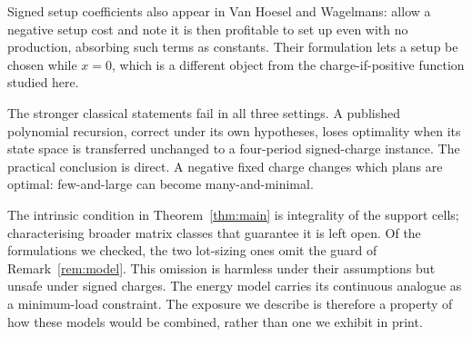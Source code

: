 \documentclass[review,11pt]{elsarticle}
\theoremstyle{remark}
\theoremstyle{definition}
\begin{document}
Signed setup coefficients also appear in Van Hoesel and Wagelmans:
\cite{vhw93} allow a negative setup cost and note it is then profitable to set up even
with no production, absorbing such terms as constants. Their formulation lets a
setup be chosen while $x=0$, which is a different object from the charge-if-positive
function studied here.

The stronger classical statements fail in all three settings. A
published polynomial recursion, correct under its own hypotheses, loses optimality when
its state space is transferred unchanged to a four-period signed-charge instance. The
practical conclusion is direct. A negative fixed charge changes which plans are optimal:
few-and-large can become many-and-minimal.

The intrinsic condition in Theorem~\ref{thm:main} is integrality of the support cells;
characterising broader matrix classes that guarantee it is left open. Of the formulations
we checked, the two lot-sizing ones \cite{apr15,lcw01} omit the
guard of Remark~\ref{rem:model}. This omission is harmless under their assumptions but
unsafe under signed charges. The energy model \cite{raheli23} carries its continuous analogue as a
minimum-load constraint. The exposure we describe is therefore a property of how these models would be
combined, rather than one we exhibit in print.
\end{document}
